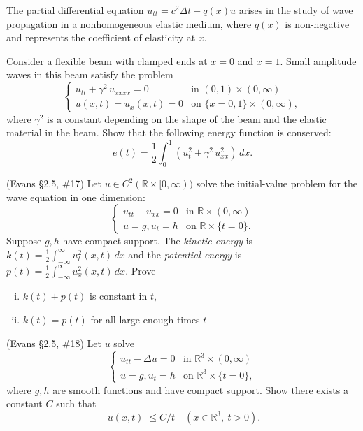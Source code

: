 \documentclass[12pt,fleqn,leqno]{exam}
\newcommand{\R}{\ensuremath{\mathbb{R}}}
\begin{document}
\begin{questions}

\question The partial differential equation $u_{tt} = c^2 \Delta t - q(x) u$ arises in the study of wave propagation in a nonhomogeneous elastic medium, where $q(x)$ is non-negative and represents the coefficient of elasticity at $x$.


\question Consider a flexible beam with clamped ends at $x = 0$ and $x = 1$. Small amplitude waves in this beam satisfy the problem
\[\begin{cases}
u_{tt} + \gamma^2\,u_{xxxx} = 0 & \text{in } (0,1) \times (0,\infty) \\
u(x,t) = u_x(x,t) = 0 & \text{on } \{x = 0,1\} \times (0,\infty),
\end{cases}\]
where $\gamma^2$ is a constant depending on the shape of the beam and the elastic material in the beam. Show that the following energy function is conserved:
\[e(t) = \frac12 \int_0^1 (u_t^2 + \gamma^2\,u_{xx}^2)\,dx.\]

\question (Evans \S2.5, \#17) Let $u \in C^2(\R \times [0, \infty))$ solve the initial-value problem for the wave equation in one dimension:
\[\begin{cases}
u_{tt} - u_{xx} = 0 & \text{in } \R \times (0,\infty) \\
u = g, u_t = h & \text{on } \R \times \{t = 0\}.
\end{cases}\]
Suppose $g,h$ have compact support. The \emph{kinetic energy} is $k(t) = \frac12 \int_{-\infty}^\infty u_t^2(x,t)\,dx$ and the \emph{potential energy} is $p(t) = \frac12 \int_{-\infty}^\infty u_x^2(x,t)\,dx$. Prove

\begin{enumerate}[(i)]
\item $k(t) + p(t)$ is constant in $t$,
\item $k(t) = p(t)$ for all large enough times $t$
\end{enumerate}

\question (Evans \S2.5, \#18) Let $u$ solve
\[\begin{cases}
u_{tt} - \Delta u = 0 & \text{in } \R^3 \times (0,\infty) \\
u = g, u_t = h & \text{on } \R^3 \times \{t = 0\},
\end{cases}\]
where $g,h$ are smooth functions and have compact support. Show there exists a constant $C$ such that
\[|u(x,t)| \leq C/t \quad (x \in \R^3,\ t > 0).\]

\end{questions}
\end{document}
